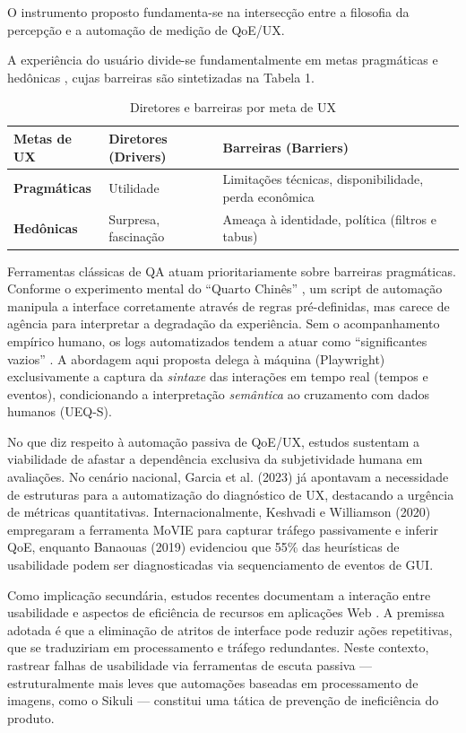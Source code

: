 \documentclass[12pt]{article}
\begin{document}
O instrumento proposto fundamenta-se na intersecção entre a filosofia da percepção e a automação de medição de QoE/UX.

A experiência do usuário divide-se fundamentalmente em metas pragmáticas e hedônicas \cite{grigis2024}, cujas barreiras são sintetizadas na Tabela 1.

\begin{table}[htbp]
  \centering
  \caption{Diretores e barreiras por meta de UX}
  \begin{tabular}{p{2.5cm} p{4cm} p{7cm}}
    \toprule
    \textbf{Metas de UX} & \textbf{Diretores (Drivers)} & \textbf{Barreiras (Barriers)} \\
    \midrule
    \textbf{Pragmáticas} & Utilidade & Limitações técnicas, disponibilidade, perda econômica \\
    \textbf{Hedônicas} & Surpresa, fascinação & Ameaça à identidade, política (filtros e tabus) \\
    \bottomrule
  \end{tabular}
\end{table}

Ferramentas clássicas de QA atuam prioritariamente sobre barreiras pragmáticas. Conforme o experimento mental do ``Quarto Chinês'' \cite{searle1982}, um script de automação manipula a interface corretamente através de regras pré-definidas, mas carece de agência para interpretar a degradação da experiência. Sem o acompanhamento empírico humano, os logs automatizados tendem a atuar como ``significantes vazios'' \cite{rousi2019}. A abordagem aqui proposta delega à máquina (Playwright) exclusivamente a captura da \textit{sintaxe} das interações em tempo real (tempos e eventos), condicionando a interpretação \textit{semântica} ao cruzamento com dados humanos (UEQ-S).

No que diz respeito à automação passiva de QoE/UX, estudos sustentam a viabilidade de afastar a dependência exclusiva da subjetividade humana em avaliações. No cenário nacional, Garcia et al. (2023) já apontavam a necessidade de estruturas para a automatização do diagnóstico de UX, destacando a urgência de métricas quantitativas. Internacionalmente, Keshvadi e Williamson (2020) empregaram a ferramenta MoVIE para capturar tráfego passivamente e inferir QoE, enquanto Banaouas (2019) evidenciou que 55\% das heurísticas de usabilidade podem ser diagnosticadas via sequenciamento de eventos de GUI.

Como implicação secundária, estudos recentes documentam a interação entre usabilidade e aspectos de eficiência de recursos em aplicações Web \cite{oyedeji2019,rani2024}. A premissa adotada é que a eliminação de atritos de interface pode reduzir ações repetitivas, que se traduziriam em processamento e tráfego redundantes. Neste contexto, rastrear falhas de usabilidade via ferramentas de escuta passiva --- estruturalmente mais leves que automações baseadas em processamento de imagens, como o Sikuli \cite{savoldi2018} --- constitui uma tática de prevenção de ineficiência do produto.
\end{document}
